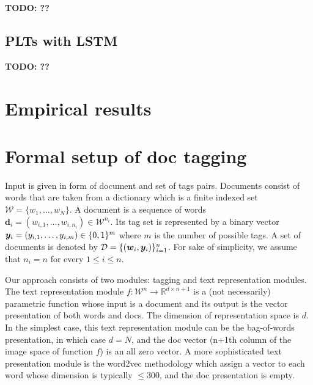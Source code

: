 \documentclass{article}
\newcommand{\cD}{\mathcal{D}}
\newcommand{\bd}{\mathbf{d}}
\newcommand{\calW}{\mathcal{W}}
\newcommand\R{\mathbb{R}}   %
\newcommand{\sectionBefore}{-0pt}
\newcommand{\sectionAfter}{-0pt}
\begin{document}
\textbf{TODO: ??}

\vspace{\sectionBefore}
\subsection{PLTs with LSTM}
\label{sec:sparse_input}
\vspace{\sectionAfter}

\textbf{TODO: ??}

\vspace{\sectionBefore}
\section{Empirical results}
\label{sec:empirical_results}
\vspace{\sectionAfter}





\vspace{\sectionBefore}
\section{Formal setup of doc tagging}
\label{sec:formal}
\vspace{\sectionAfter}


Input is given in form of document and set of tags pairs. Documents consist of words that are taken from a dictionary which is a finite indexed set $\calW = \{ w_1, \dots , w_N \}$. A document is a sequence of words  $\bd_i = (w_{i,1}, \dots, w_{i,n_i})\in \calW^{n_i}$. Its tag set is represented  by a binary vector $\boldsymbol{y}_i = (y_{i,1}, \ldots, y_{i,m}) \in \{ 0 , 1 \}^m$ where $m$ is the number of possible tags. A set of documents is denoted by $\cD = \{ (\bw_i, \by_{i}) \}_{i=1}^n$. For sake of simplicity, we assume that $n_i = n$ for every $1\le i \le n$.

Our approach consists of two modules: tagging and text representation modules. The text representation module $f : \calW^{n} \rightarrow \R^{d \times n+1}$ is a (not necessarily) parametric function whose input is a document and its output is the vector presentation of both words and docs. The dimension of representation space is $d$. In the simplest case, this text representation module can be the bag-of-words presentation, in which case $d=N$, and the doc vector (n+1\/th column of the image space of function $f$) is an all zero vector. A more sophisticated text presentation module is the word2vec methodology which assign a vector to each word whose dimension is typically $\le300$, and the doc presentation is empty. 
\end{document}
